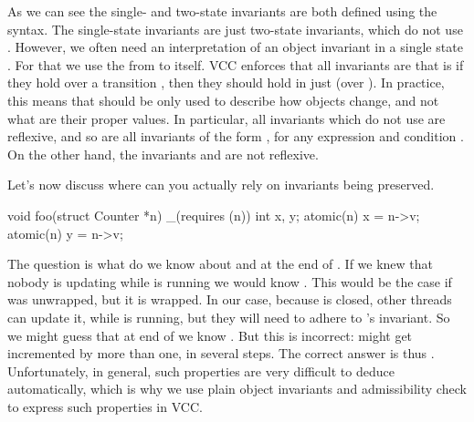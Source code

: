 As we can see the single- and two-state invariants are both defined
using the  syntax.
The single-state invariants are just two-state invariants, which do not use
.
However, we often need an interpretation of an object invariant in a single state .
For that we use the  from  to  itself.
VCC enforces that all invariants are  that is if they hold
over a transition , then they should hold in just 
(\ie over ).
In practice,
this means that  should be only used to describe
how objects change, and not what are their proper values.
In particular,
all invariants which do not use  are reflexive, and so
are all invariants of the form , for any expression  and condition .
On the other hand, the invariants  and  are not reflexive.

Let's now discuss where can you actually rely on invariants being preserved.

\begin{VCC}
void foo(struct Counter *n)
  _(requires \wrapped(n))
{
  int x, y;
  atomic(n) { x = n->v; }
  atomic(n) { y = n->v; }
}
\end{VCC}

\noindent
The question is what do we know about  and 
at the end of .
If we knew that nobody is updating  while 
is running we would know .
This would be the case if  was unwrapped, but it is wrapped.
In our case, because  is closed, other threads can update it,
while  is running, but they will need to
adhere to 's invariant.
So we might guess that at end of  we know
.
But this is incorrect:  might get incremented
by more than one, in several steps.
The correct answer is thus .
Unfortunately, in general, such properties are very difficult to deduce
automatically, which is why we use plain object invariants and admissibility
check to express such properties in VCC.

